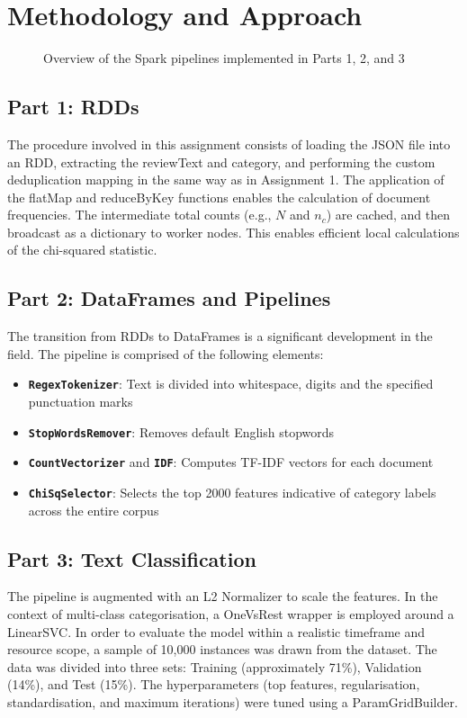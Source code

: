 \documentclass[11pt,a4paper]{article}
\begin{document}
\section{Methodology and Approach}

\begin{figure}[h]
    \centering
    
    \caption{Overview of the Spark pipelines implemented in Parts 1, 2, and 3}
    \label{fig:pipeline}
\end{figure}

\subsection{Part 1: RDDs}
The procedure involved in this assignment consists of loading the JSON file into an RDD, extracting the reviewText and category, and performing the custom deduplication mapping in the same way as in Assignment 1. The application of the flatMap and reduceByKey functions enables the calculation of document frequencies. The intermediate total counts (e.g., $N$ and $n_c$) are cached, and then broadcast as a dictionary to worker nodes. This enables efficient local calculations of the chi-squared statistic.

\subsection{Part 2: DataFrames and Pipelines}
The transition from RDDs to DataFrames is a significant development in the field. The pipeline is comprised of the following elements:
\begin{itemize}
    \item \textbf{\texttt{RegexTokenizer}}: Text is divided into whitespace, digits and the specified punctuation marks
    \item \textbf{\texttt{StopWordsRemover}}: Removes default English stopwords
    \item \textbf{\texttt{CountVectorizer}} and \textbf{\texttt{IDF}}: Computes TF-IDF vectors for each document
    \item \textbf{\texttt{ChiSqSelector}}: Selects the top 2000 features indicative of category labels across the entire corpus
\end{itemize}

\subsection{Part 3: Text Classification}
The pipeline is augmented with an L2 Normalizer to scale the features. In the context of multi-class categorisation, a OneVsRest wrapper is employed around a LinearSVC. In order to evaluate the model within a realistic timeframe and resource scope, a sample of 10,000 instances was drawn from the dataset. The data was divided into three sets: Training (approximately 71\%), Validation (14\%), and Test (15\%). The hyperparameters (top features, regularisation, standardisation, and maximum iterations) were tuned using a ParamGridBuilder. 
\end{document}
